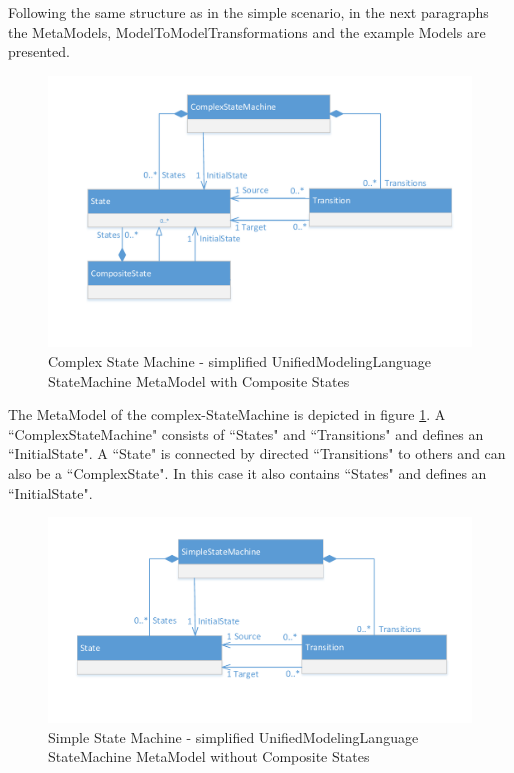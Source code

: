 Following the same structure as in the simple scenario, in the next paragraphs the \glspl{MetaModel}, \glspl{ModelToModelTransformation} and the example \glspl{Model} are presented.

\begin{figure}[htb]
	\centering
	\includegraphics[scale=0.6, trim=0cm 1cm 0cm 1cm, clip=true]{Images/ScenarioBehavioralComplexStateMachine.pdf} 
	\caption{Complex State Machine - simplified \Gls{UnifiedModelingLanguage} \gls{StateMachine} \gls{MetaModel} with Composite States}
	\label{figScenarioBehavioralComplexStateMachine}
\end{figure}

The \gls{MetaModel} of the complex-\gls{StateMachine} is depicted in figure \ref{figScenarioBehavioralComplexStateMachine}. A ``ComplexStateMachine" consists of ``States" and ``Transitions" and defines an ``InitialState". A ``State" is connected by directed ``Transitions" to others and can also be a ``ComplexState". In this case it also contains ``States" and defines an ``InitialState".

\begin{figure}[htb]
	\centering
	\includegraphics[scale=0.6, trim=0cm 1cm 0cm 1cm, clip=true]{Images/ScenarioBehavioralComplexSimpleStateMachine.pdf} 
	\caption{Simple State Machine - simplified \Gls{UnifiedModelingLanguage} \gls{StateMachine} \gls{MetaModel} without Composite States}
	\label{figScenarioBehavioralComplexSimpleStateMachine}
\end{figure}

